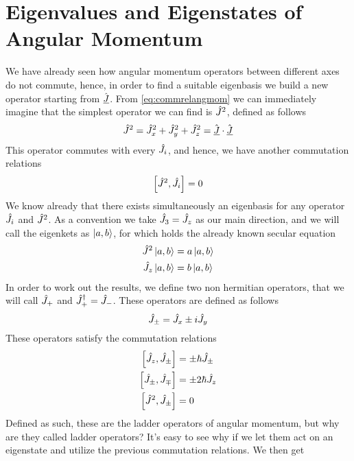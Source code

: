 \documentclass[../qm.tex]{subfiles}
\begin{document}
	\section{Eigenvalues and Eigenstates of Angular Momentum}
	We have already seen how angular momentum operators between different axes do not commute, hence, in order to find a suitable eigenbasis we build a new operator starting from $\hat{\underline{J}}$. From \eqref{eq:commrelangmom} we can immediately imagine that the simplest operator we can find is $\hat{J}^2$, defined as follows
	\begin{equation*}
		\hat{J}^2=\hat{J}_x^2+\hat{J}_y^2+\hat{J}_z^2=\hat{\underline{J}}\cdot\hat{\underline{J}}
	\end{equation*}
	This operator commutes with every $\hat{J}_i$, and hence, we have another commutation relations
	\begin{equation}
		\comm{\opr{J}^2}{\opr{J}_i}=0
		\label{eq:jsqjcommrel}
	\end{equation}
	We know already that there exists simultaneously an eigenbasis for any operator $\hat{J}_i$ and $\hat{J}^2$. As a convention we take $\hat{J}_3=\hat{J}_z$ as our main direction, and we will call the eigenkets as $\ket{a,b}$, for which holds the already known secular equation
	\begin{equation*}
		\begin{aligned}
			\hat{J}^2\ket{a,b}&=a\ket{a,b}\\
			\hat{J}_z\ket{a,b}&=b\ket{a,b}
		\end{aligned}
	\end{equation*}
	In order to work out the results, we define two non hermitian operators, that we will call $\hat{J}_+$ and $\hat{J}^{\dagger}_+=\hat{J}_-$. These operators are defined as follows
	\begin{equation}
		\hat{J}_{\pm}=\hat{J}_x\pm i\hat{J}_y
		\label{eq:ladderopangmom}
	\end{equation}
	These operators satisfy the commutation relations
	\begin{equation}
		\begin{aligned}
			\comm{\opr{J}_z}{\opr{J}_{\pm}}&=\pm\hbar\opr{J}_{\pm}\\
			\comm{\opr{J}_{\pm}}{\opr{J}_{\mp}}&=\pm2\hbar\opr{J}_z\\
			\comm{\opr{J}^2}{\opr{J}_{\pm}}&=0
		\end{aligned}
		\label{eq:ladderopcommrel}
	\end{equation}
	Defined as such, these are the ladder operators of angular momentum, but why are they called ladder operators? It's easy to see why if we let them act on an eigenstate and utilize the previous commutation relations. We then get
\end{document}
